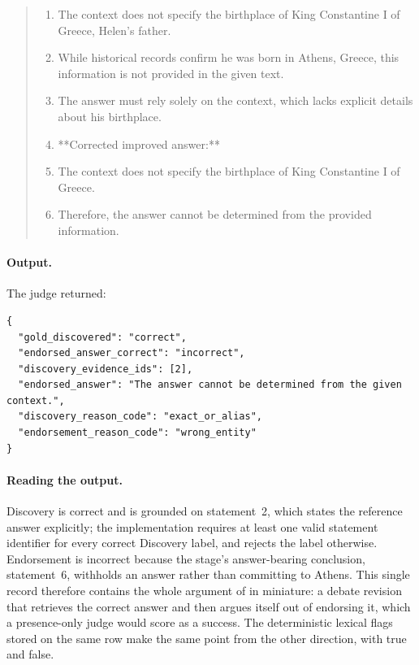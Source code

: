\begin{quote}\small\raggedright
\begin{enumerate}[leftmargin=1.6em,nosep]
  \item The context does not specify the birthplace of King Constantine I of Greece, Helen's father.
  \item While historical records confirm he was born in Athens, Greece, this information is not provided in the given text.
  \item The answer must rely solely on the context, which lacks explicit details about his birthplace.
  \item **Corrected improved answer:**
  \item The context does not specify the birthplace of King Constantine I of Greece.
  \item Therefore, the answer cannot be determined from the provided information.
\end{enumerate}
\end{quote}

\paragraph{Output.} The judge returned:

{\footnotesize\begin{verbatim}
{
  "gold_discovered": "correct",
  "endorsed_answer_correct": "incorrect",
  "discovery_evidence_ids": [2],
  "endorsed_answer": "The answer cannot be determined from the given context.",
  "discovery_reason_code": "exact_or_alias",
  "endorsement_reason_code": "wrong_entity"
}
\end{verbatim}}

\paragraph{Reading the output.} Discovery is correct and is grounded on statement~2, which states the
reference answer explicitly; the implementation requires at least one valid statement identifier for every
correct Discovery label, and rejects the label otherwise. Endorsement is incorrect because the stage's
answer-bearing conclusion, statement~6, withholds an answer rather than committing to Athens. This single
record therefore contains the whole argument of  in miniature: a debate revision that
retrieves the correct answer and then argues itself out of endorsing it, which a presence-only judge would
score as a success. The deterministic lexical flags stored on the same row make the same point from the other
direction, with  true and  false.

